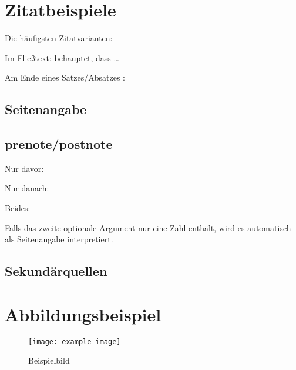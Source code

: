 \section{Zitatbeispiele}

Die häufigsten Zitatvarianten:

Im Fließtext: 
\textcite{averroes/bland} behauptet, dass …

Am Ende eines Satzes/Absatzes :
\parencite{knuth:ct:related}

\subsection{Seitenangabe}

\parencite[5]{westfahl:space}


\subsection{prenote/postnote}

Nur davor:
\parencite[vgl.][]{jaffe}

Nur danach:
\parencite[Tabelle 5]{jaffe}

Beides:
\parencite[vgl.][8]{jaffe}

Falls das zweite optionale Argument nur eine Zahl enthält, wird es automatisch als Seitenangabe interpretiert. 

\subsection{Sekundärquellen}

\parencites{doody}[zitiert in][]{aksin}

\section{Abbildungsbeispiel}

\begin{figure}
\caption{Beispielbild}

\texttt{[image: example-image]}

\end{figure}


